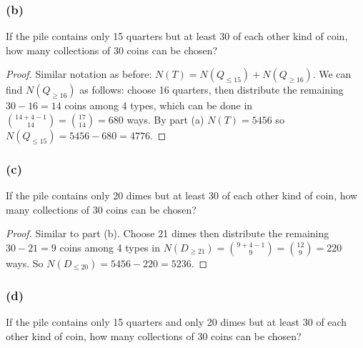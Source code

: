 \documentclass[14pt]{extarticle}
\begin{document}
\subsubsection{(b)}
If the pile contains only 15 quarters but at least 30 of each other kind of coin, how many collections of 30 coins can be
chosen?

\begin{proof}
     Similar notation as before: \(N(T) = N(Q_{\leq 15}) + N(Q_{\geq 16})\). We can find \(N(Q_{\geq 16})\) as follows:
     choose 16 quarters, then distribute the remaining \(30-16=14\) coins among 4 types, which can be done in \(\binom{14+4-1}{14}
     = \binom{17}{14} = 680\) ways. By part (a) \(N(T) = 5456\) so \(N(Q_{\leq 15}) = 5456 - 680 = 4776\).
\end{proof}

\subsubsection{(c)}
If the pile contains only 20 dimes but at least 30 of each other kind of coin, how many collections of 30 coins can be
chosen?

\begin{proof}
     Similar to part (b). Choose 21 dimes then distribute the remaining \(30-21=9\) coins among 4 types in \(N(D_{\geq 21})
     = \binom{9+4-1}{9} = \binom{12}{9} = 220\) ways. So \(N(D_{\leq 20}) = 5456 - 220 = 5236\).
\end{proof}

\subsubsection{(d)}
If the pile contains only 15 quarters and only 20 dimes but at least 30 of each other kind of coin, how many collections of
30 coins can be chosen?
\end{document}
